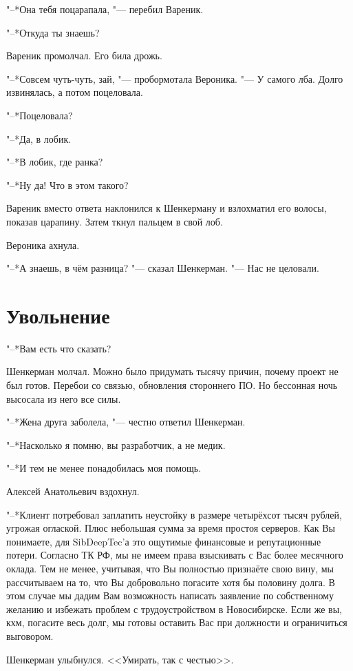 "--*Она тебя поцарапала, "--- перебил Вареник.

"--*Откуда ты знаешь?

Вареник промолчал.
Его била дрожь.

"--*Совсем чуть-чуть, зай, "--- пробормотала Вероника.
"--- У самого лба.
Долго извинялась, а потом поцеловала.

"--*Поцеловала?

"--*Да, в лобик.

"--*В лобик, где ранка?

"--*Ну да!
Что в этом такого?

Вареник вместо ответа наклонился к Шенкерману и взлохматил его волосы, показав царапину.
Затем ткнул пальцем в свой лоб.

Вероника ахнула.

"--*А знаешь, в чём разница? "--- сказал Шенкерман.
"--- Нас не целовали.

\section{Увольнение}

"--*Вам есть что сказать?

Шенкерман молчал.
Можно было придумать тысячу причин, почему проект не был готов.
Перебои со связью, обновления стороннего ПО.
Но бессонная ночь высосала из него все силы.

"--*Жена друга заболела, "--- честно ответил Шенкерман.

"--*Насколько я помню, вы разработчик, а не медик.

"--*И тем не менее понадобилась моя помощь.

Алексей Анатольевич вздохнул.

"--*Клиент потребовал заплатить неустойку в размере четырёхсот тысяч рублей, угрожая оглаской.
Плюс небольшая сумма за время простоя серверов.
Как Вы понимаете, для SibDeepTec'а это ощутимые финансовые и репутационные потери.
Согласно ТК РФ, мы не имеем права взыскивать с Вас более месячного оклада.
Тем не менее, учитывая, что Вы полностью признаёте свою вину, мы рассчитываем на то, что Вы добровольно погасите хотя бы половину долга.
В этом случае мы дадим Вам возможность написать заявление по собственному желанию и избежать проблем с трудоустройством в Новосибирске.
Если же вы, кхм, погасите весь долг, мы готовы оставить Вас при должности и ограничиться выговором.

Шенкерман улыбнулся.
<<Умирать, так с честью>>.

